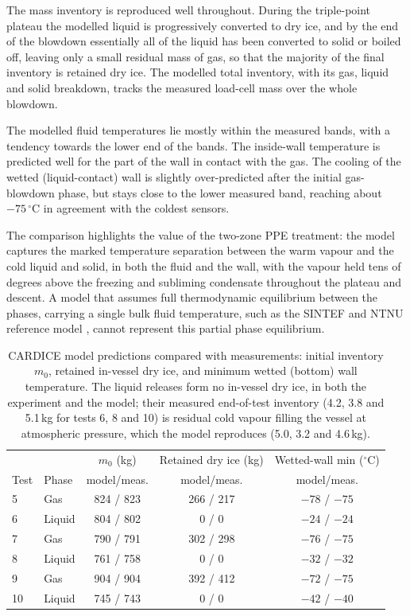 \documentclass[5p,authoryear]{elsarticle}
\begin{document}
The mass inventory is reproduced well throughout. During the triple-point plateau the modelled
liquid is progressively converted to dry ice, and by the end of the blowdown essentially all of the
liquid has been converted to solid or boiled off, leaving only a small residual mass of gas, so
that the majority of the final inventory is retained dry ice. The modelled total inventory, with
its gas, liquid and solid breakdown, tracks the measured load-cell mass over the whole blowdown.

The modelled fluid temperatures lie mostly within the measured bands, with a tendency towards the
lower end of the bands. The inside-wall temperature is predicted well for the part of the wall in
contact with the gas. The cooling of the wetted (liquid-contact) wall is slightly over-predicted
after the initial gas-blowdown phase, but stays close to the lower measured band, reaching about
$-75\,^\circ$C in agreement with the coldest sensors.

The comparison highlights the value of the two-zone PPE treatment: the
model captures the marked temperature separation between the warm vapour and the cold liquid and
solid, in both the fluid and the wall, with the vapour held tens of degrees above the freezing and
subliming condensate throughout the plateau and descent. A model that assumes full thermodynamic
equilibrium between the phases, carrying a single bulk fluid temperature, such as the SINTEF and
NTNU reference model \citep{Hoydalsvik2026}, cannot represent this partial phase equilibrium.

\begin{table}[!tbh]
\centering
\caption{CARDICE model predictions compared with measurements: initial inventory $m_0$,
retained in-vessel dry ice, and minimum wetted (bottom) wall temperature. The liquid releases
form no in-vessel dry ice, in both the experiment and the model; their measured end-of-test
inventory (4.2, 3.8 and 5.1\,kg for tests 6, 8 and 10) is residual cold vapour filling the vessel
at atmospheric pressure, which the model reproduces (5.0, 3.2 and 4.6\,kg).}
\label{tab:cardice-results}
\begin{tabular}{llccc}
\toprule
 & & $m_0$ (kg) & Retained dry ice (kg) & Wetted-wall min ($^\circ$C) \\
Test & Phase & model/meas. & model/meas. & model/meas. \\
\midrule
5  & Gas    & 824 / 823 & 266 / 217 & $-78$ / $-75$ \\
6  & Liquid & 804 / 802 & 0 / 0     & $-24$ / $-24$ \\
7  & Gas    & 790 / 791 & 302 / 298 & $-76$ / $-75$ \\
8  & Liquid & 761 / 758 & 0 / 0     & $-32$ / $-32$ \\
9  & Gas    & 904 / 904 & 392 / 412 & $-72$ / $-75$ \\
10 & Liquid & 745 / 743 & 0 / 0     & $-42$ / $-40$ \\
\bottomrule
\end{tabular}
\end{table}
\end{document}

